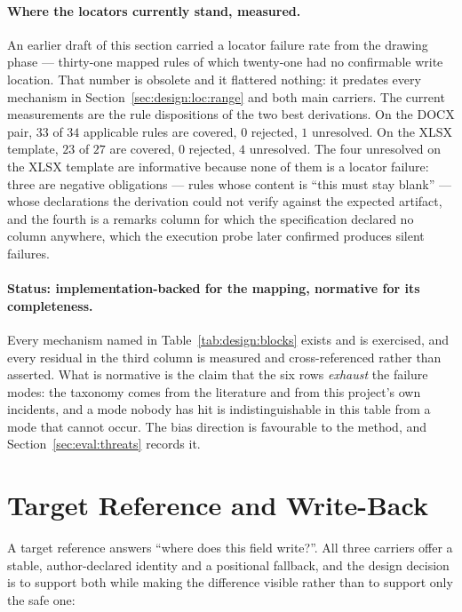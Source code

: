 \paragraph{Where the locators currently stand, measured.}
An earlier draft of this section carried a locator failure rate from the drawing phase ---
thirty-one mapped rules of which twenty-one had no confirmable write location. That number is
obsolete and it flattered nothing: it predates every mechanism in
Section~\ref{sec:design:loc:range} and both main carriers. The current measurements are the
rule dispositions of the two best derivations. On the DOCX pair, $33$ of $34$ applicable rules
are covered, $0$ rejected, $1$ unresolved. On the XLSX template, $23$ of $27$ are covered, $0$
rejected, $4$ unresolved. The four unresolved on the XLSX template are informative because
none of them is a locator failure: three are negative obligations --- rules whose content is
``this must stay blank'' --- whose declarations the derivation could not verify against the
expected artifact, and the fourth is a remarks column for which the specification declared no
column anywhere, which the execution probe later confirmed produces silent failures.

\paragraph{Status: implementation-backed for the mapping, normative for its completeness.}
Every mechanism named in Table~\ref{tab:design:blocks} exists and is exercised, and every
residual in the third column is measured and cross-referenced rather than asserted. What is
normative is the claim that the six rows \emph{exhaust} the failure modes: the taxonomy comes
from the literature and from this project's own incidents, and a mode nobody has hit is
indistinguishable in this table from a mode that cannot occur. The bias direction is
favourable to the method, and Section~\ref{sec:eval:threats} records it.

\section{Target Reference and Write-Back}
\label{sec:design:targets}

A target reference answers ``where does this field write?''. All three carriers offer a
stable, author-declared identity and a positional fallback, and the design decision is to
support both while making the difference visible rather than to support only the safe one:

